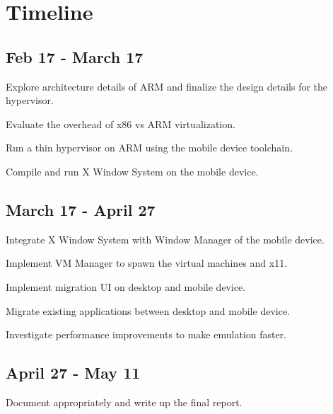 \section{Timeline}
\subsection{Feb 17 - March 17}
	\begin{itemize*}
	\item Explore architecture details of ARM and finalize the design details for the hypervisor.
	\item Evaluate the overhead of x86 vs ARM virtualization.
	\item Run a thin hypervisor on ARM using the mobile device toolchain.
	\item Compile and run X Window System on the mobile device.
	\end{itemize*}
\subsection{March 17 - April 27}
	\begin{itemize*}
	\item Integrate X Window System with Window Manager of the mobile device.
	\item Implement VM Manager to spawn the virtual machines and x11.
  \item Implement migration UI on desktop and mobile device.
  \item Migrate existing applications between desktop and mobile device.
	\item Investigate performance improvements to make emulation faster.
	\end{itemize*}
\subsection{April 27 - May 11}
	\begin{itemize*}
	\item Document appropriately and write up the final report.
	\end{itemize*}
